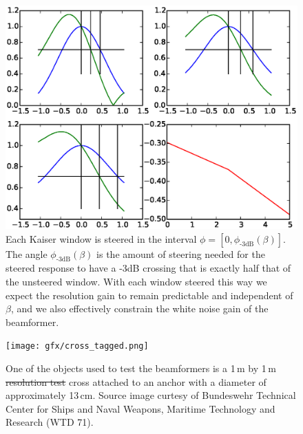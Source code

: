 \documentclass[10pt,journal,draftclsnofoot,onecolumn]{IEEEtran}
\let\MYoriglatexcaption\caption               %
\renewcommand{\caption}[2][\relax]{\MYoriglatexcaption[#2]{#2}}
\newcommand\1{\vec 1}
\providecommand{\DIFdel}[1]{{\protect\color{red}\sout{#1}}}                      %
\providecommand{\DIFdelFL}[1]{\DIFdel{#1}} %
\providecommand{\DIFaddbeginFL}{} %
\providecommand{\DIFaddendFL}{} %
\providecommand{\DIFdelbeginFL}{} %
\providecommand{\DIFdelendFL}{} %
\begin{document}
\begin{figure}[tbp]\DIFdelbeginFL %
\DIFdelendFL %
\DIFdelbeginFL %
\DIFdelendFL \DIFaddbeginFL \includegraphics[width=\linewidth]{gfx/calc_kaiser_3dB.eps}\DIFaddendFL %
\caption{Each Kaiser window is steered in the interval $\phi=[0, \phi_{\text{-3dB}}(\beta)]$. The angle $\phi_{\text{-3dB}}(\beta)$ is the amount of steering needed for the steered response to have a -3dB crossing that is exactly half that of the unsteered window. With each window steered this way we expect the resolution gain to remain predictable and independent of $\beta$, and we also effectively constrain the white noise gain of the beamformer.}\label{windows_steering}
\end{figure}

\begin{figure}[tbp]\DIFdelbeginFL %
\DIFdelendFL %
\DIFdelbeginFL %
\DIFdelendFL \DIFaddbeginFL \texttt{[image: gfx/cross\_tagged.png]}\DIFaddendFL %
\caption{One of the objects used to test the beamformers is a 1\,m by 1\,m \DIFdelbeginFL \DIFdelFL{resolution test }\DIFdelendFL cross attached to an anchor with a diameter of approximately 13\,cm. Source image curtesy of Bundeswehr Technical Center for Ships and Naval Weapons, Maritime Technology and Research (WTD 71).}\label{cross}
\end{figure}
\end{document}
